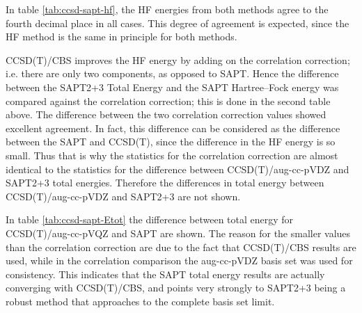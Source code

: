 \begin{multicols}{2}


In table \ref{tab:ccsd-sapt-hf}, the HF energies from both methods agree to the fourth decimal place in all cases.
This degree of agreement is expected, since the HF method is the same in principle for both methods.

CCSD(T)/CBS improves the HF energy by adding on the correlation correction; i.e. there are only two components, as opposed to SAPT.
Hence the difference between the SAPT2+3 Total Energy and the SAPT Hartree--Fock energy was compared against the correlation correction; this is done in the second table above.
The difference between the two correlation correction values showed excellent agreement. 
In fact, this difference can be considered as the difference between the SAPT and CCSD(T), since the difference in the HF energy is so small.
Thus that is why the statistics for the correlation correction are almost identical to the statistics for the difference between CCSD(T)/aug-cc-pVDZ and SAPT2+3 total energies.
Therefore the differences in total energy between CCSD(T)/aug-cc-pVDZ and SAPT2+3 are not shown. 


In table \ref{tab:ccsd-sapt-Etot} the difference between total energy for CCSD(T)/aug-cc-pVQZ and SAPT are shown.
The reason for the smaller values than the correlation correction are due to the fact that CCSD(T)/CBS results are used, while in the correlation comparison the aug-cc-pVDZ basis set was used for consistency. 
This indicates that the SAPT total energy results are actually converging with CCSD(T)/CBS, and points very strongly to SAPT2+3 being a robust method that approaches to the complete basis set limit.

\end{multicols}

